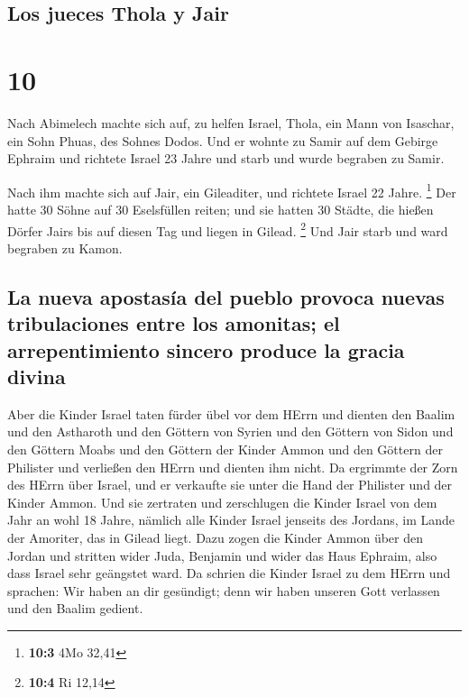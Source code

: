 \hypertarget{los-jueces-thola-y-jair}{%
\subsection{Los jueces Thola y Jair}\label{los-jueces-thola-y-jair}}

\hypertarget{section-9}{%
\section{10}\label{section-9}}

 Nach Abimelech machte sich auf, zu helfen Israel, Thola,
ein Mann von Isaschar, ein Sohn Phuas, des Sohnes Dodos. Und er wohnte
zu Samir auf dem Gebirge Ephraim  und richtete Israel 23
Jahre und starb und wurde begraben zu Samir.

 Nach ihm machte sich auf Jair, ein Gileaditer, und
richtete Israel 22 Jahre. \footnote{\textbf{10:3} 4Mo 32,41}
 Der hatte 30 Söhne auf 30 Eselsfüllen reiten; und sie
hatten 30 Städte, die hießen Dörfer Jairs bis auf diesen Tag und liegen
in Gilead. \footnote{\textbf{10:4} Ri 12,14}  Und Jair
starb und ward begraben zu Kamon.

\hypertarget{la-nueva-apostasuxeda-del-pueblo-provoca-nuevas-tribulaciones-entre-los-amonitas-el-arrepentimiento-sincero-produce-la-gracia-divina}{%
\subsection{La nueva apostasía del pueblo provoca nuevas tribulaciones
entre los amonitas; el arrepentimiento sincero produce la gracia
divina}\label{la-nueva-apostasuxeda-del-pueblo-provoca-nuevas-tribulaciones-entre-los-amonitas-el-arrepentimiento-sincero-produce-la-gracia-divina}}

 Aber die Kinder Israel taten fürder übel vor dem HErrn
und dienten den Baalim und den Astharoth und den Göttern von Syrien und
den Göttern von Sidon und den Göttern Moabs und den Göttern der Kinder
Ammon und den Göttern der Philister und verließen den HErrn und dienten
ihm nicht.  Da ergrimmte der Zorn des HErrn über Israel,
und er verkaufte sie unter die Hand der Philister und der Kinder Ammon.
 Und sie zertraten und zerschlugen die Kinder Israel von
dem Jahr an wohl 18 Jahre, nämlich alle Kinder Israel jenseits des
Jordans, im Lande der Amoriter, das in Gilead liegt.  Dazu
zogen die Kinder Ammon über den Jordan und stritten wider Juda, Benjamin
und wider das Haus Ephraim, also dass Israel sehr geängstet ward.
 Da schrien die Kinder Israel zu dem HErrn und sprachen:
Wir haben an dir gesündigt; denn wir haben unseren Gott verlassen und
den Baalim gedient.

